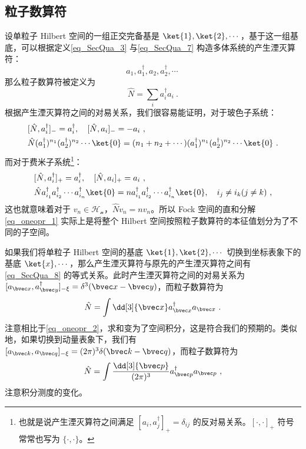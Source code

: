 \subsection{粒子数算符}
设单粒子 Hilbert 空间的一组正交完备基是 $\ket{1},\ket{2},\cdots$，基于这一组基底，可以根据定义\autoref{eq_SecQua_3} 与\autoref{eq_SecQua_7} 构造多体系统的产生湮灭算符：
\begin{equation}
a_1,a^\dagger_1,a_2,a^\dagger_2,\cdots~
\end{equation}
那么粒子数算符被定义为
\begin{equation}\label{eq_oneopr_2}
\hat N=\sum_i a_i^\dagger a_i~.
\end{equation}
根据产生湮灭算符之间的对易关系，我们很容易能证明，对于玻色子系统：
\begin{equation}
\begin{aligned}
&[\hat N,a_i^\dagger]_-=a_i^\dagger,\quad [\hat N,a_i]_-=-a_i~,\\
&\hat N (a_1^\dagger)^{n_1} (a_2^\dagger)^{n_2}\cdots \ket{0} = (n_1+n_2+\cdots)   (a_1^\dagger)^{n_1} (a_2^\dagger)^{n_2}\cdots \ket{0} ~.
\end{aligned}
\end{equation}
而对于费米子系统\footnote{也就是说产生湮灭算符之间满足 $[a_i,a_j^\dagger]_+=\delta_{ij}$ 的反对易关系。$[\cdot,\cdot]_+$ 符号常常也写为 $\{\cdot,\cdot\}$。}：
\begin{equation}
\begin{aligned}
&[\hat N,a_i^\dagger]_+=a_i^\dagger,\quad [\hat N,a_i]_+=a_i~,\\
&\hat N a_{i_1}^\dagger a_{i_2}^\dagger \cdots a_{i_n}^\dagger \ket{0}= n a_{i_1}^\dagger a_{i_2}^\dagger \cdots a_{i_n}^\dagger \ket{0},\quad i_j\neq i_k(j\neq k)~,
\end{aligned}
\end{equation}
这也就意味着对于 $v_n\in \mathcal{H_n}$，$\hat N v_n=n v_n$。所以 Fock 空间的直和分解 \autoref{eq_oneopr_1} 实际上是将整个 Hilbert 空间按照粒子数算符的本征值划分为了不同的子空间。

如果我们将单粒子 Hilbert 空间的基底 $\ket{1},\ket{2},\cdots$ 切换到坐标表象下的基底 $\ket{x},\cdots$，那么产生湮灭算符与原先的产生湮灭算符之间有\autoref{eq_SecQua_8} 的等式关系。此时产生湮灭算符之间的对易关系为 $[a_{\bvec x},a_{\bvec y}^\dagger]_{-\xi}=\delta^3(\bvec x-\bvec y)$，而粒子数算符为
\begin{equation}
\begin{aligned}
\hat N=\int \dd[3]{\bvec x} a^\dagger_{\bvec x} a_{\bvec x}~.
\end{aligned}
\end{equation}
注意相比于\autoref{eq_oneopr_2}，求和变为了空间积分，这是符合我们的预期的。类似地，如果切换到动量表象下，我们有 $[a_{\bvec k},a_{\bvec q}]_{-\xi}= (2\pi)^3 \delta(\bvec k-\bvec q)$，而粒子数算符为
\begin{equation}
\begin{aligned}
\hat N=\int \frac{\dd[3]{\bvec p}}{(2\pi)^3} a^\dagger_{\bvec p} a_{\bvec p}~,
\end{aligned}
\end{equation}
注意积分测度的变化。
